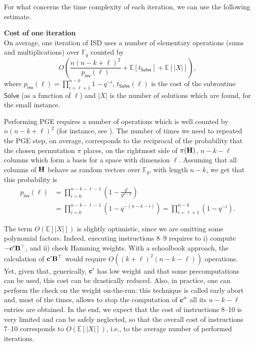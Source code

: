 For what concerns the time complexity of each iteration, we can use the following estimate.
\begin{proposition}\textbf{Cost of one iteration}\\
On average, one iteration of ISD uses a number of elementary operations (sums and multiplications) over $\mathbb F_q$ counted by
$$O\left(\frac{n(n-k+\ell)^2}{p_{\mathsf{inv}}(\ell)}+\mathbb E[t_{\mathsf{Solve}}]+\mathbb E[|X|]\right),$$
where $p_{\mathsf{inv}}(\ell) = \prod_{i = \ell+1}^{n-k}1-q^{-i}$, $t_{\mathsf{Solve}}(\ell)$ is the cost of the subroutine $\mathsf{Solve}$ (as a function of $\ell$) and $|X|$ is the number of solutions which are found, for the small instance.
\end{proposition}
\begin{IEEEproof}
Performing PGE requires a number of operations which is well counted by $n(n-k+\ell)^2$ (for instance, see \cite{peters2010information}).
The number of times we need to repeated the PGE step, on average, corresponds to the reciprocal of the probability that the chosen permutation $\pi$ places, on the rightmost side of $\pi(\mathbf H)$, $n-k-\ell$ columns which form a basis for a space with dimension $\ell$.
Assuming that all columns of $\mathbf H$ behave as random vectors over $\mathbb F_q$, with length $n-k$, we get that this probability is
\begin{align*}
p_{\mathsf{inv}}(\ell) & = \prod_{i = 0}^{n-k-\ell-1}\left(1-\frac{q^i}{q^{n-k}}\right)\\\nonumber
& = \prod_{i = 0}^{n-k-\ell-1}\left(1 - q^{-(n-k-i)}\right)= \prod_{i = \ell+1}^{n-k}\left(1 - q^{-i}\right).
\end{align*}
\end{IEEEproof}
\begin{remark}
The term $O\left(\mathbb E[|X|]\right)$ is slightly optimistic, since we are omitting some polynomial factors.
Indeed, executing instructions 8--9 requires to i) compute  $-\mathbf c'\mathbf B^\top$, and ii) check Hamming weights.
With a schoolbook approach, the calculation of $\mathbf c'\mathbf B^\top$ would require $O\left((k+\ell)^2(n-k-\ell)\right)$ operations.
Yet, given that, generically, $\mathbf c'$ has low weight and that some precomputations can be used, this cost can be drastically reduced.
Also, in practice, one can perform the check on the weight on-the-run: this technique is called early abort and, most of the times, allows to stop the computation of $\mathbf c''$ all its $n-k-\ell$ entries are obtained.
In the end, we expect that the cost of instructions 8--10 is very limited and can be safely neglected, so that the overall cost of instructions 7--10 corresponds to $O\left(\mathbb E[|X|]\right)$, i.e., to the average number of performed iterations.
\end{remark}

